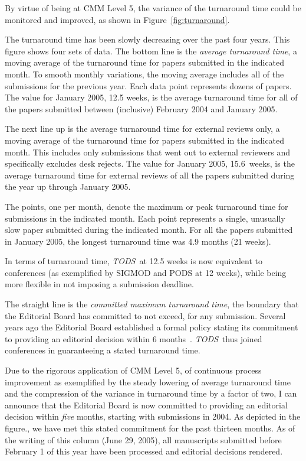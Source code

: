 \documentclass[11pt]{article}
\newcommand{\tods}{{\em TODS\/}}
\begin{document}
By virtue of being at CMM Level 5, the variance of the turnaround time could
be monitored and improved, as shown in Figure~\ref{fig:turnaround}.

The turnaround time has been slowly decreasing over the past four years.
This figure shows four sets of data. The bottom line is the {\em average
turnaround time}, a moving average of the turnaround time for papers
submitted in the indicated month. To smooth monthly variations, the moving
average includes all of the submissions for the previous year. Each data
point represents dozens of papers. The value for January 2005, 12.5 weeks,
is the average turnaround time for all of the papers submitted between
(inclusive) February 2004 and January 2005.

The next line up is the average turnaround time for external reviews only, a
moving average of the turnaround time for papers submitted in the indicated
month. This includes only submissions that went out to external reviewers
and specifically excludes desk rejects. The value for January
2005, \hbox{15.6~weeks}, is the average turnaround time for external reviews
of all the papers submitted during the year up through January 2005.

The points, one per month, denote the maximum or peak turnaround time for
submissions in the indicated month. Each point represents a single,
unusually slow paper submitted during the indicated month. For all the
papers submitted in January 2005, the longest turnaround time was 4.9
months (21 weeks).

In terms of turnaround time, \tods\ at 12.5 weeks is now equivalent to
conferences (as exemplified by \hbox{SIGMOD} and PODS at 12 weeks), while
being more flexible in not imposing a submission deadline.

The straight line is the {\em committed maximum turnaround time}, the
boundary that the Editorial Board has committed to not exceed, for any
submission. Several years ago the Editorial Board established a formal
policy stating its commitment to providing an editorial decision within 6
months~\cite{SnodgrassSept03}. \tods\ thus joined conferences in
guaranteeing a stated turnaround time.

Due to the rigorous application of CMM Level 5, of continuous process
improvement as exemplified by the steady lowering of average turnaround time
and the compression of the variance in turnaround time by a factor of two,
I can announce that the Editorial Board is now committed to providing an
editorial decision within {\em five} months, starting with submissions in
2004. As depicted in the figure., we have met this stated commitment for the
past thirteen months. As of the writing of this column (June 29, 2005),
all manuscripts submitted before February 1 of this year have been processed
and editorial decisions rendered.
\end{document}
